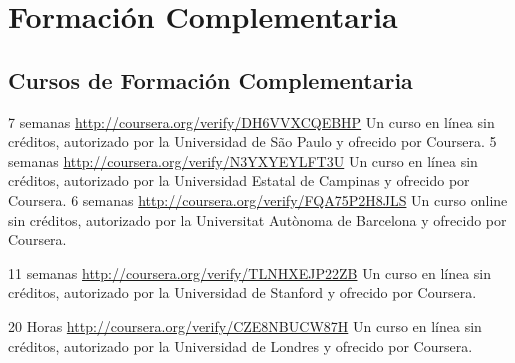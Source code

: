\documentclass[11pt,a4paper,sans]{moderncv} %
\begin{document}
\section{Formación Complementaria}

\subsection{ Cursos de Formación Complementaria }
	      {7 semanas}
	      {\url{http://coursera.org/verify/DH6VVXCQEBHP}}{}
	      {Un curso en línea sin créditos, autorizado por la Universidad de São Paulo y ofrecido por Coursera.}
	      {5 semanas}
	      {\url{http://coursera.org/verify/N3YXYEYLFT3U}}{}
	      {Un curso en línea sin créditos, autorizado por la Universidad Estatal de Campinas y ofrecido por Coursera.}
	      {6 semanas}
	      {\url{http://coursera.org/verify/FQA75P2H8JLS}}{}
	      {Un curso online sin créditos, autorizado por la Universitat Autònoma de Barcelona y ofrecido por Coursera.}

	      {11 semanas}
	      {\url{http://coursera.org/verify/TLNHXEJP22ZB}}{}
	      {Un curso en línea sin créditos, autorizado por la Universidad de Stanford y ofrecido por Coursera.}

	      {20 Horas}
	      {\url{http://coursera.org/verify/CZE8NBUCW87H}}{}
	      {Un curso en línea sin créditos, autorizado por la Universidad de Londres y ofrecido por Coursera.}




\end{document}
